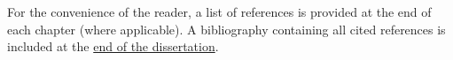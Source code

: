 \begin{example}
\end{example}


%
\ifperchapterbib%
For the convenience of the reader, a list of references is provided at the end of each chapter (where applicable).
\ifendbib%
A bibliography containing all cited references is included at the \hyperref[sec:bibliography]{end of the dissertation}.
\else\fi%
\cbend%
\else\fi%